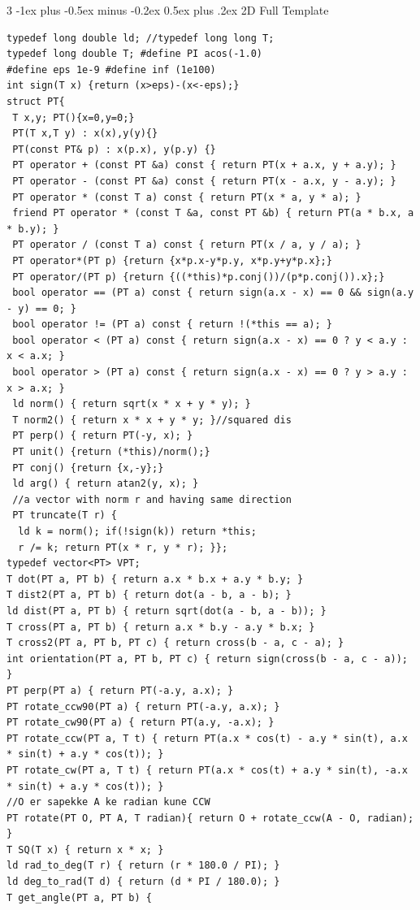 \documentclass[8pt,a4paper,onesided]{article}
\makeatletter
\renewcommand{\subsection}{\@startsection{subsection}{2}{0mm}
    {-1ex plus -0.5ex minus -0.2ex} %
    {0.5ex plus .2ex}                %
    {\normalfont\large\bfseries}}    %
\makeatother
\begin{document}
\begin{multicols}{3}
\subsection{2D Full Template}
\begin{verbatim}
typedef long double ld; //typedef long long T;
typedef long double T; #define PI acos(-1.0)
#define eps 1e-9 #define inf (1e100)
int sign(T x) {return (x>eps)-(x<-eps);}
struct PT{
 T x,y; PT(){x=0,y=0;}
 PT(T x,T y) : x(x),y(y){}
 PT(const PT& p) : x(p.x), y(p.y) {}
 PT operator + (const PT &a) const { return PT(x + a.x, y + a.y); }
 PT operator - (const PT &a) const { return PT(x - a.x, y - a.y); }
 PT operator * (const T a) const { return PT(x * a, y * a); }
 friend PT operator * (const T &a, const PT &b) { return PT(a * b.x, a * b.y); }
 PT operator / (const T a) const { return PT(x / a, y / a); }
 PT operator*(PT p) {return {x*p.x-y*p.y, x*p.y+y*p.x};}
 PT operator/(PT p) {return {((*this)*p.conj())/(p*p.conj()).x};}
 bool operator == (PT a) const { return sign(a.x - x) == 0 && sign(a.y - y) == 0; }
 bool operator != (PT a) const { return !(*this == a); }
 bool operator < (PT a) const { return sign(a.x - x) == 0 ? y < a.y : x < a.x; }
 bool operator > (PT a) const { return sign(a.x - x) == 0 ? y > a.y : x > a.x; }
 ld norm() { return sqrt(x * x + y * y); }
 T norm2() { return x * x + y * y; }//squared dis
 PT perp() { return PT(-y, x); }
 PT unit() {return (*this)/norm();}
 PT conj() {return {x,-y};}
 ld arg() { return atan2(y, x); }
 //a vector with norm r and having same direction
 PT truncate(T r) { 
  ld k = norm(); if(!sign(k)) return *this;
  r /= k; return PT(x * r, y * r); }};
typedef vector<PT> VPT;
T dot(PT a, PT b) { return a.x * b.x + a.y * b.y; }
T dist2(PT a, PT b) { return dot(a - b, a - b); }
ld dist(PT a, PT b) { return sqrt(dot(a - b, a - b)); }
T cross(PT a, PT b) { return a.x * b.y - a.y * b.x; }
T cross2(PT a, PT b, PT c) { return cross(b - a, c - a); }
int orientation(PT a, PT b, PT c) { return sign(cross(b - a, c - a)); }
PT perp(PT a) { return PT(-a.y, a.x); }
PT rotate_ccw90(PT a) { return PT(-a.y, a.x); }
PT rotate_cw90(PT a) { return PT(a.y, -a.x); }
PT rotate_ccw(PT a, T t) { return PT(a.x * cos(t) - a.y * sin(t), a.x * sin(t) + a.y * cos(t)); }
PT rotate_cw(PT a, T t) { return PT(a.x * cos(t) + a.y * sin(t), -a.x * sin(t) + a.y * cos(t)); }
//O er sapekke A ke radian kune CCW
PT rotate(PT O, PT A, T radian){ return O + rotate_ccw(A - O, radian); }
T SQ(T x) { return x * x; }
ld rad_to_deg(T r) { return (r * 180.0 / PI); }
ld deg_to_rad(T d) { return (d * PI / 180.0); }
T get_angle(PT a, PT b) {

\end{verbatim}
\end{multicols}
\end{document}
